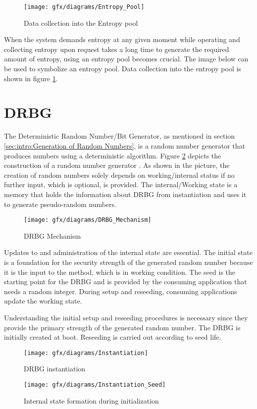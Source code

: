 \begin{figure}[!h]
	\centering
	\texttt{[image: gfx/diagrams/Entropy\_Pool]}
	\caption{Data collection into the Entropy pool}
	\label{fig:2:9}
\end{figure}

When the system demands entropy at any given moment while operating and collecting entropy upon request takes a long time to generate the required amount of entropy, using an entropy pool becomes crucial. The image below can be used to symbolize an entropy pool. Data collection into the entropy pool is shown in figure \ref{fig:2:9}.

%
%
\section{DRBG}
\label{sec:fundamentals:drbg}

The Deterministic Random Number/Bit Generator, as mentioned in section \ref{sec:intro:Generation of Random Numbers}, is a random number generator that produces numbers using a deterministic algorithm. Figure \ref{fig:2:10} depicts the construction of a random number generator \cite{SP90A-2015}. As shown in the picture, the creation of random numbers solely depends on working/internal status if no further input, which is optional, is provided. The internal/Working state is a memory that holds the information about DRBG from instantiation and uses it to generate pseudo-random numbers.

\begin{figure}[!h]
	\centering
	\texttt{[image: gfx/diagrams/DRBG\_Mechanism]}
	\caption{DRBG Mechanism}
	\label{fig:2:10}
\end{figure}

Updates to and administration of the internal state are essential. The initial state is a foundation for the security strength of the generated random number because it is the input to the method, which is in working condition. The seed is the starting point for the DRBG and is provided by the consuming application that needs a random integer. During setup and reseeding, consuming applications update the working state.

Understanding the initial setup and reseeding procedures is necessary since they provide the primary strength of the generated random number. The DRBG is initially created at boot. Reseeding is carried out according to seed life.

\begin{figure}[!h]
	\centering
	\begin{minipage}[b]{5 cm}
		\texttt{[image: gfx/diagrams/Instantiation]} 
		\caption{DRBG instantiation}
		\label{fig:2:11}
	\end{minipage}
	\begin{minipage}[b]{5 cm}
		\texttt{[image: gfx/diagrams/Instantiation\_Seed]}  
		\caption{Internal state formation during initialization}
		\label{fig:2:12}
	\end{minipage}
\end{figure}


